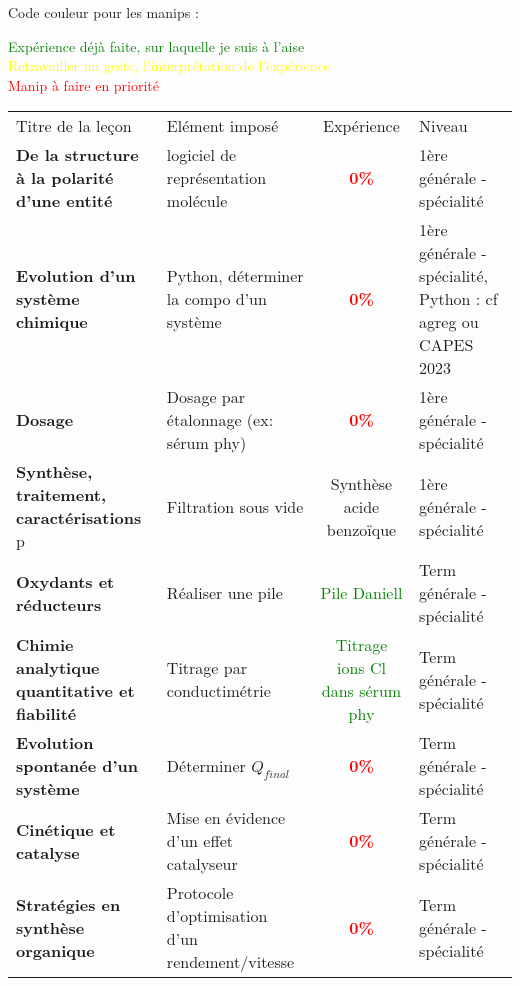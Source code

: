 \begin{changemargin}{-1.5cm}{-0cm}

Code couleur pour les manips :
\begin{center}
\textcolor{green}{Expérience déjà faite, sur laquelle je suis à l'aise}\\
\textcolor{yellow}{Retravailler un geste, l'interprétation de l'expérience}\\
\textcolor{red}{Manip à faire en priorité}\\
\end{center}

\begin{tabularx}{\paperwidth-2cm}{| X | X | c | X |}
  \hline
  \rowcolor{gray!20}\multicolumn{4}{c}{Avancement préparation oraux Leçons Chimie} \\
  \hline 
  Titre de la leçon & Elément imposé & Expérience & Niveau \\
  \hline
  \textbf{De la structure à la polarité d'une entité} & logiciel de représentation molécule & \textcolor{red}{\textbf{0\%}}  & 1ère générale - spécialité  \\
  \hline
  \textbf{Evolution d'un système chimique} & Python, déterminer la compo d'un système & \textcolor{red}{\textbf{0\%}}  & 1ère générale - spécialité, Python : cf agreg ou CAPES 2023  \\
  \hline
  \textbf{Dosage} & Dosage par étalonnage (ex: sérum phy) & \textcolor{red}{\textbf{0\%}}  & 1ère générale - spécialité \\
  \hline
  \textbf{Synthèse, traitement, caractérisations} p\pageref{LC_SyntheseTraitement} & Filtration sous vide & Synthèse acide benzoïque  & 1ère générale - spécialité \\
  \hline
  \hline
  \textbf{Oxydants et réducteurs} & Réaliser une pile & \textcolor{green}{Pile Daniell}  & Term générale - spécialité \\
  \hline
  \textbf{Chimie analytique quantitative et fiabilité} & Titrage par conductimétrie & \textcolor{green}{Titrage ions Cl dans sérum phy}  & Term générale - spécialité  \\
  \hline
  \textbf{Evolution spontanée d'un système} & Déterminer $Q_{final}$ & \textcolor{red}{\textbf{0\%}}  & Term générale - spécialité  \\
  \hline
  \textbf{Cinétique et catalyse} & Mise en évidence d'un effet catalyseur & \textcolor{red}{\textbf{0\%}}  & Term générale - spécialité  \\
  \hline
  \textbf{Stratégies en synthèse organique} & Protocole d'optimisation d'un rendement/vitesse & \textcolor{red}{\textbf{0\%}}  & Term générale - spécialité  \\

\end{tabularx}
\end{changemargin}
